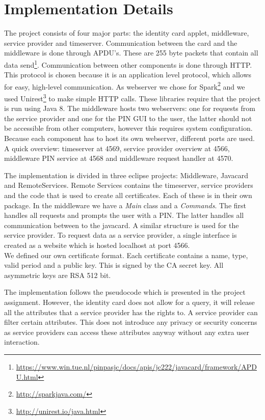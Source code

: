 \documentclass[12pt]{report}
\begin{document}
\section{Implementation Details}
The project consists of four major parts: the identity card applet, middleware, service provider and timeserver. Communication between the card and the middleware is done through APDU's. These are 255 byte packets that contain all data send\footnote{\url{https://www.win.tue.nl/pinpasjc/docs/apis/jc222/javacard/framework/APDU.html}}. Communication between other components is done through HTTP. This protocol is chosen because it is an application level protocol, which allows for easy, high-level communication. As webserver we chose for Spark\footnote{\url{http://sparkjava.com/}} and we used Unirest\footnote{\url{http://unirest.io/java.html}} to make simple HTTP calls. These libraries require that the project is run using Java 8. The middleware hosts two webservers: one for requests from the service provider and one for the PIN GUI to the user, the latter should not be accessible from other computers, however this requires system configuration. Because each component has to host its own webserver, different ports are used. A quick overview: timeserver at 4569, service provider overview at 4566, middleware PIN service at 4568 and middleware request handler at 4570.

The implementation is divided in three eclipse projects: Middleware, Javacard and RemoteServices. Remote Services contains the timeserver, service providers and the code that is used to create all certificates. Each of these is in their own package. In the middleware we have a \emph{Main} class and a \emph{Commands}. The first handles all requests and prompts the user with a PIN. The latter handles all communication between to the javacard. A similar structure is used for the service provider. To request data as a service provider, a single interface is created as a website which is hosted localhost at port 4566.\\
We defined our own certificate format. Each certificate contains a name, type, valid period and a public key. This is signed by the CA secret key. All asymmetric keys are RSA 512 bit.

The implementation follows the pseudocode which is presented in the project assignment. However, the identity card does not allow for a query, it will release all the attributes that a service provider has the rights to. A service provider can filter certain attributes. This does not introduce any privacy or security concerns as service providers can access these attributes anyway without any extra user interaction.
\end{document}
